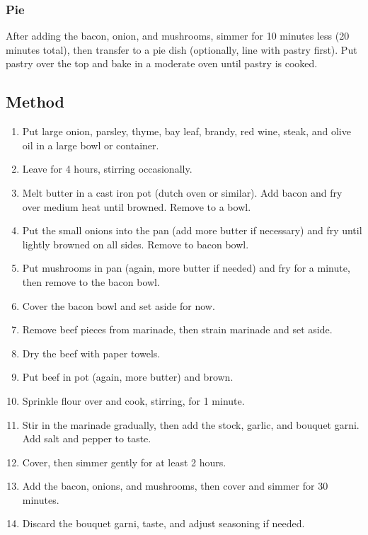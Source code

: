 \begin{multicols}{2}
        \subsubsection{Pie}
          After adding the bacon, onion, and mushrooms, simmer for 10 minutes less (20 minutes total), then transfer to a pie dish (optionally, line with pastry first). Put pastry over the top and bake in a moderate oven until pastry is cooked.

      \vfill\null
    \columnbreak
    \subsection{Method}
      \begin{enumerate}
        \item Put large onion, parsley, thyme, bay leaf, brandy, red wine, steak, and olive oil in a large bowl or container.
        \item Leave for 4 hours, stirring occasionally.
        \item Melt butter in a cast iron pot (dutch oven or similar). Add bacon and fry over medium heat until browned. Remove to a bowl.
        \item Put the small onions into the pan (add more butter if necessary) and fry until lightly browned on all sides. Remove to bacon bowl.
        \item Put mushrooms in pan (again, more butter if needed) and fry for a minute, then remove to the bacon bowl.
        \item Cover the bacon bowl and set aside for now.
        \item Remove beef pieces from marinade, then strain marinade and set aside.
        \item Dry the beef with paper towels.
        \item Put beef in pot (again, more butter) and brown.
        \item Sprinkle flour over and cook, stirring, for 1 minute.
        \item Stir in the marinade gradually, then add the stock, garlic, and bouquet garni. Add salt and pepper to taste.
        \item Cover, then simmer gently for at least 2 hours.
        \item Add the bacon, onions, and mushrooms, then cover and simmer for 30 minutes.
        \item Discard the bouquet garni, taste, and adjust seasoning if needed.
      \end{enumerate}
    \end{multicols}
